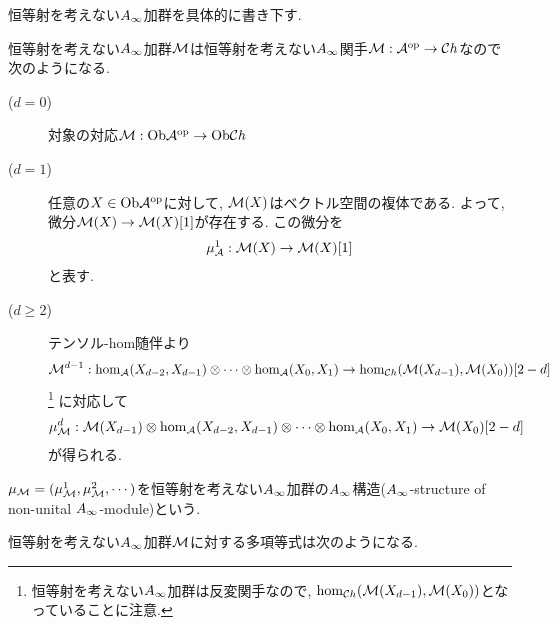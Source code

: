 \documentclass[uplatex, a4paper, 14Q, dvipdfmx]{jsarticle}
\begin{document}
恒等射を考えない$A_{\infty}$加群を具体的に書き下す.

\begin{definition}
  恒等射を考えない$A_{\infty}$加群$\mathcal{M}$は恒等射を考えない$A_{\infty}$関手$\mathcal{M} : \mathcal{A}^\mathrm{op} \to \mathcal{C} h$なので次のようになる. 
  \begin{description}
    \item[($d=0$)] 対象の対応$\mathcal{M} : \mathrm{Ob}\mathcal{A}^\mathrm{op} \to \mathrm{Ob}\mathcal{C} h$
    \item[($d=1$)] 任意の$X \in \mathrm{Ob}\mathcal{A}^\mathrm{op}$に対して, $\mathcal{M}(X)$はベクトル空間の複体である.
    よって, 微分$\mathcal{M}(X) \to \mathcal{M}(X)[1]$が存在する. 
    この微分を
    \begin{align*}
      \mu^1_{\mathcal{A}} : \mathcal{M}(X) \to \mathcal{M}(X)[1]
    \end{align*}
    と表す. 
    \item[($d \geq 2$)] テンソル-hom随伴より
    \begin{align*}
      \mathcal{M}^{d-1} : \hom_{\mathcal{A}}(X_{d-2},X_{d-1}) \otimes \cdots \otimes \hom_{\mathcal{A}}(X_0,X_1) \to \hom_{\mathcal{C} h}(\mathcal{M}(X_{d-1}),\mathcal{M}(X_0))[2-d]
    \end{align*}
    \footnote{
      恒等射を考えない$A_{\infty}$加群は反変関手なので, $\hom_{\mathcal{C} h}(\mathcal{M}(X_{d-1}),\mathcal{M}(X_0))$となっていることに注意. 
    }
    に対応して
    \begin{align*}
      \mu^d_{\mathcal{M}} : \mathcal{M}(X_{d-1}) \otimes \hom_{\mathcal{A}}(X_{d-2},X_{d-1}) \otimes \cdots \otimes \hom_{\mathcal{A}}(X_0,X_1) \to \mathcal{M}(X_0)[2-d]
    \end{align*}
    が得られる.
  \end{description}
  $\mu_{\mathcal{M}} =(\mu_{\mathcal{M}}^1,\mu_{\mathcal{M}}^2,\cdots)$を恒等射を考えない$A_{\infty}$加群の$A_{\infty}$構造($A_{\infty}$-structure of non-unital $A_{\infty}$-module)という. 
\end{definition}


恒等射を考えない$A_{\infty}$加群$\mathcal{M}$に対する多項等式は次のようになる.
\end{document}
